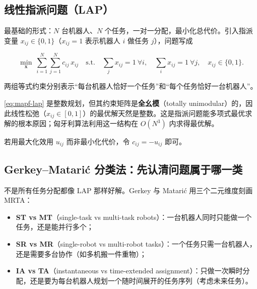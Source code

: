 \subsection{线性指派问题（LAP）}
\label{sec:mapf-lap}

最基础的形式：$N$ 台机器人、$N$ 个任务，一对一分配，最小化总代价。引入指派变量 $x_{ij}\in\{0,1\}$（$x_{ij}=1$ 表示机器人 $i$ 做任务 $j$），问题写成

\begin{equation}
  \min_{\mathbf{x}}\ \sum_{i=1}^{N}\sum_{j=1}^{N} c_{ij}\,x_{ij}\quad\text{s.t.}\quad
  \sum_j x_{ij}=1\ \forall i,\quad \sum_i x_{ij}=1\ \forall j,\quad x_{ij}\in\{0,1\}.
  \label{eq:mapf-lap}
\end{equation}

两组等式约束分别表示“每台机器人恰好一个任务”和“每个任务恰好一台机器人”。

\begin{theorem}\label{thm:mapf-tu}
\cref{eq:mapf-lap} 是整数规划，但其约束矩阵是\textbf{全幺模}（totally unimodular）的，因此线性松弛（$x_{ij}\in[0,1]$）的最优解天然是整数。这是指派问题能多项式最优求解的根本原因；匈牙利算法利用这一结构在 $O(N^3)$ 内求得最优解\cite{kuhn1955hungarian,munkres1957algorithms}。
\end{theorem}

\noindent 若用最大化效用 $u_{ij}$ 而非最小化代价，令 $c_{ij}=-u_{ij}$ 即可。

\subsection{Gerkey--Matari\'c 分类法：先认清问题属于哪一类}
\label{sec:mapf-taxonomy}

不是所有任务分配都像 LAP 那样好解。Gerkey 与 Matari\'c 用三个二元维度刻画 MRTA\cite{gerkey2004taxonomy}：

\begin{definition}\label{def:mapf-taxonomy}
\begin{itemize}
  \item \textbf{ST vs MT}（single-task vs multi-task robots）：一台机器人同时只能做一个任务，还是能并行多个；
  \item \textbf{SR vs MR}（single-robot vs multi-robot tasks）：一个任务只需一台机器人，还是需要多台协作（如多机搬一件重物）；
  \item \textbf{IA vs TA}（instantaneous vs time-extended assignment）：只做一次瞬时分配，还是要为每台机器人规划一个随时间展开的任务序列（考虑未来任务）。
\end{itemize}
\end{definition}

